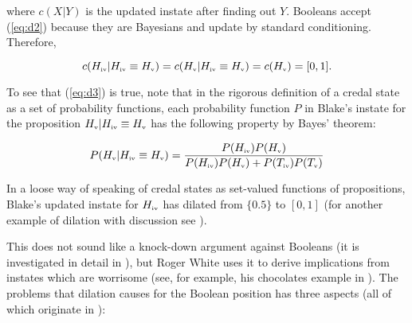 \documentclass[11pt]{article}
\begin{document}
where $c(X|Y)$ is the updated instate after finding out $Y$. Booleans
accept (\ref{eq:d2}) because they are Bayesians and update by standard
conditioning. Therefore,


\begin{equation}
  \label{eq:d3}
  c(H_{\mbox{\tiny{iv}}}|H_{\mbox{\tiny{iv}}}\equiv{}H_{\mbox{\tiny{v}}})=c(H_{\mbox{\tiny{v}}}|H_{\mbox{\tiny{iv}}}\equiv{}H_{\mbox{\tiny{v}}})=c(H_{\mbox{\tiny{v}}})=[0,1].
\end{equation}

To see that (\ref{eq:d3}) is true, note that in the rigorous
definition of a credal state as a set of probability functions, each
probability function $P$ in Blake's instate for the proposition
$H_{\mbox{\tiny{v}}}|H_{\mbox{\tiny{iv}}}\equiv{}H_{\mbox{\tiny{v}}}$
has the following property by Bayes' theorem:

\begin{equation}
  \label{eq:zeibaefu}
  P(H_{\mbox{\tiny{v}}}|H_{\mbox{\tiny{iv}}}\equiv{}H_{\mbox{\tiny{v}}})=\frac{P(H_{\mbox{\tiny{iv}}})P(H_{\mbox{\tiny{v}}})}{P(H_{\mbox{\tiny{iv}}})P(H_{\mbox{\tiny{v}}})+P(T_{\mbox{\tiny{iv}}})P(T_{\mbox{\tiny{v}}})}
\end{equation}

In a loose way of speaking of credal states as set-valued functions
of propositions, Blake's updated instate for $H_{\mbox{\tiny{iv}}}$
has dilated from $\{0.5\}$ to $[0,1]$ (for another example of dilation
with discussion see ).

This does not sound like a knock-down argument against Booleans (it is
investigated in detail in ), but
Roger White uses it to derive implications from instates which are
worrisome (see, for example, his chocolates example in
). The problems that dilation causes
for the Boolean position has three aspects (all of which originate in
):
\end{document}
